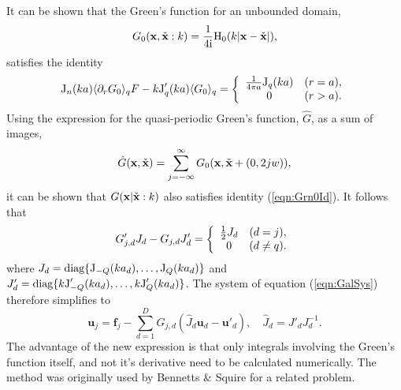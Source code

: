 \documentclass[12pt,a4paper]{article}
\newcommand{\rad}{a}
\newcommand{\bx}{{\bf x}}
\newcommand{\bxo}{\check{\textbf{x}}}
\newcommand{\bu}{\textbf{u}}
\newcommand{\bfI}{\textbf{f}}
\newcommand{\tho}{\check{\theta}}
\begin{document}
It can be shown that the Green's function for an unbounded domain, \ie
\begin{equation}
G_{0}(\bx,\bxo:k)
=
\frac{1}{4\ci}
\besh_{0}(k\vert\bx-\bxo\vert)
,
\end{equation}
satisfies the  identity
\begin{equation}\label{eqn:Grn0Id}
\besj_{n}(k\rad)
\langle
\partial_{r}
G_{0}
\rangle_{q}F
-
k\besj_{q}'(k\rad)
\langle
G_{0}
\rangle_{q}
=
\left\{
\begin{array}{c c}
\frac{1}{4\pi\rad}\besj_{q}(k\rad)
&
(r=\rad),
\\
0
&
(r>\rad).
\end{array}
\right.
\end{equation} 
Using the expression for the quasi-periodic Green's function, $\hat{G}$, as a sum of images, \ie
\begin{equation}
\hat{G}(\bx,\bxo)
=
\sum_{j=-\infty}^{\infty}
G_{0}(\bx,\bxo+(0,2jw))
,
\end{equation}
it can be shown that $G(\bx\vert\bxo:k)$ also satisfies identity (\ref{eqn:Grn0Id}).
It follows that
\begin{equation}
G_{j,d}'
J_{d}
-
G_{j,d}
J'_{d}
=
\left\{
\begin{array}{c c}
\frac{1}{2}J_{d}
&
(d=j),
\\
0
&
(d\neq q).
\end{array}
\right.
\end{equation}
where $J_{d}=\diag\{\besj_{-Q}(k\rad_{d}),\dots,\besj_{Q}(k\rad_{d})\}$ and 
$J'_{d}=\diag\{k\besj'_{-Q}(k\rad_{d}),\dots,k\besj'_{Q}(k\rad_{d})\}$.
The system of equation (\ref{eqn:GalSys}) therefore simplifies to
\begin{equation}\label{eqn:GalSys_ii}
\bu_{j}
=
\bfI_{j}
-
\sum_{d=1}^{D}
G_{j,d}
\left(
\hat{J}_{d}
\bu_{d}
-
\bu'_{d}
\right)
,
\quad
\hat{J}_{d}
=
J'_{d}J_{d}^{-1}
.
\end{equation}
The advantage of the new expression is that only integrals involving the Green's function itself, and not it's derivative need to be calculated numerically.
The method was originally used by Bennetts \& Squire \cite{Ben&Squ09b} for a related problem. 
\end{document}
